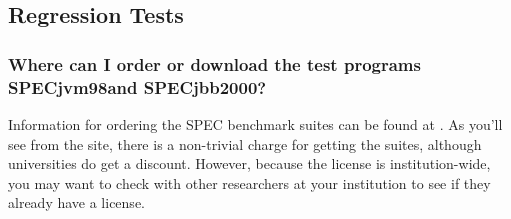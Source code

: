 \subsection{Regression Tests}
\subsubsection{Where can I order or download the test programs 
SPECjvm98\trademark and SPECjbb2000\trademark?}



Information for ordering the SPEC benchmark suites can be found at
.
As you'll see from the site, there is a non-trivial charge for getting the
suites, although universities do get a discount.
However, because the license is institution-wide, you may want to check with
other researchers at your institution to see if they already have a license.

\JavaTMFooter
